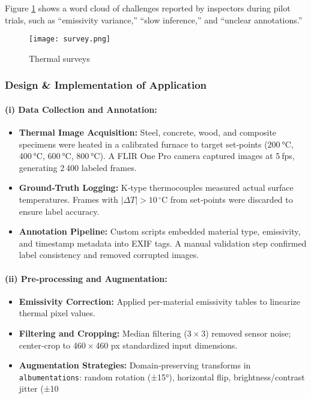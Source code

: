 \noindent Figure \ref{fig:ts_challenges} shows a word cloud of challenges reported by inspectors during pilot trials, such as “emissivity variance,” “slow inference,” and “unclear annotations.”

\begin{figure}[H]
    \centering
    \texttt{[image: survey.png]}
    \caption{Thermal surveys}
    \label{fig:ts_challenges}
\end{figure}

\subsubsection*{Design \& Implementation of Application}

\paragraph{(i) Data Collection and Annotation:}
\begin{itemize}
    \item \textbf{Thermal Image Acquisition:}  
    Steel, concrete, wood, and composite specimens were heated in a calibrated furnace to target set‐points (200 °C, 400 °C, 600 °C, 800 °C). A FLIR One Pro camera captured images at 5 fps, generating 2 400 labeled frames.
    \item \textbf{Ground‐Truth Logging:}  
    K‐type thermocouples measured actual surface temperatures. Frames with $|\Delta T| > 10\,\mathrm{^{\circ}C}$ from set‐points were discarded to ensure label accuracy.
    \item \textbf{Annotation Pipeline:}  
    Custom scripts embedded material type, emissivity, and timestamp metadata into EXIF tags. A manual validation step confirmed label consistency and removed corrupted images.
\end{itemize}

\paragraph{(ii) Pre‐processing and Augmentation:}
\begin{itemize}
    \item \textbf{Emissivity Correction:}  
    Applied per-material emissivity tables to linearize thermal pixel values.  
    \item \textbf{Filtering and Cropping:}  
    Median filtering (3 × 3) removed sensor noise; center‐crop to 460 × 460 px standardized input dimensions.  
    \item \textbf{Augmentation Strategies:}  
    Domain‐preserving transforms in \texttt{albumentations}: random rotation (±15°), horizontal flip, brightness/contrast jitter (±10 %
\end{itemize}

